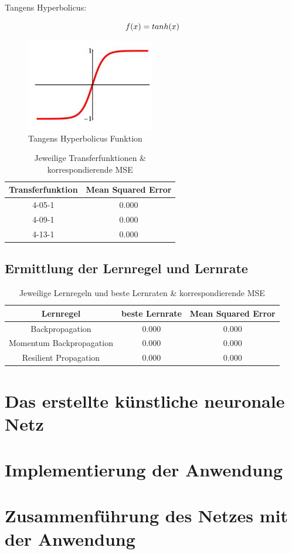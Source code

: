 Tangens Hyperbolicus:

\begin{equation}\formelentry{Tanh Funktion}
f(x)= tanh(x)
\end{equation}

\begin{figure}[htbp]
\centering
		\includegraphics[width=0.5\textwidth]{tanh.PNG}
	\caption{Tangens Hyperbolicus Funktion}
	\label{fig:Tangens Hyperbolicus Funktion}
\end{figure}

\begin{table}
  \centering
  \begin{tabular}{|c|c|}
  \hline 
  \rule[0ex]{0pt}{2.5ex} Transferfunktion & Mean Squared Error \\ 
  \hline 
  \rule[0ex]{0pt}{2.5ex} 4-05-1 & 0.000 \\ 
  \hline 
  \rule[0ex]{0pt}{2.5ex} 4-09-1 & 0.000 \\ 
  \hline 
  \rule[0ex]{0pt}{2.5ex} 4-13-1 & 0.000 \\ 
  \hline 
  \end{tabular} 
  \caption{Jeweilige Transferfunktionen \& korrespondierende MSE}
  \label{tab:tab2}
\end{table}

\subsection{Ermittlung der Lernregel und Lernrate} %

\begin{table}[H]
  \centering
  \begin{tabular}{|c|c|c|}
  \hline 
  \rule[0ex]{0pt}{2.5ex} Lernregel & beste Lernrate & Mean Squared Error \\ 
  \hline 
  \rule[0ex]{0pt}{2.5ex} Backpropagation & 0.000 & 0.000 \\ 
  \hline 
  \rule[0ex]{0pt}{2.5ex} Momentum Backpropagation & 0.000 & 0.000\\ 
  \hline 
  \rule[0ex]{0pt}{2.5ex} Resilient Propagation & 0.000 & 0.000 \\ 
  \hline 
  \end{tabular} 
  \caption{Jeweilige Lernregeln und beste Lernraten \& korrespondierende MSE}
  \label{tab:tab3}
\end{table}
\section{Das erstellte künstliche neuronale Netz}
\section{Implementierung der Anwendung} %
\section{Zusammenführung des Netzes mit der Anwendung}
